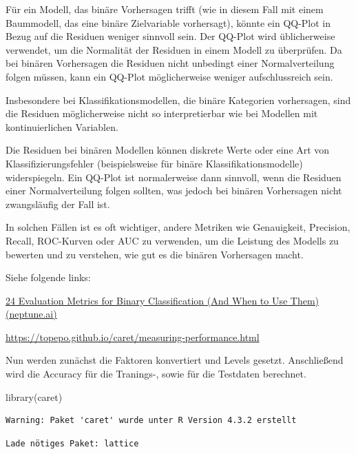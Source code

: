 \documentclass[
  letterpaper,
  DIV=11,
  numbers=noendperiod]{scrartcl}
\newenvironment{Shaded}{\begin{snugshade}}{\end{snugshade}}
\newcommand{\FunctionTok}[1]{\textcolor[rgb]{0.28,0.35,0.67}{#1}}
\newcommand{\NormalTok}[1]{\textcolor[rgb]{0.00,0.23,0.31}{#1}}
\begin{document}
Für ein Modell, das binäre Vorhersagen trifft (wie in diesem Fall mit
einem Baummodell, das eine binäre Zielvariable vorhersagt), könnte ein
QQ-Plot in Bezug auf die Residuen weniger sinnvoll sein. Der QQ-Plot
wird üblicherweise verwendet, um die Normalität der Residuen in einem
Modell zu überprüfen. Da bei binären Vorhersagen die Residuen nicht
unbedingt einer Normalverteilung folgen müssen, kann ein QQ-Plot
möglicherweise weniger aufschlussreich sein.

Insbesondere bei Klassifikationsmodellen, die binäre Kategorien
vorhersagen, sind die Residuen möglicherweise nicht so interpretierbar
wie bei Modellen mit kontinuierlichen Variablen.

Die Residuen bei binären Modellen können diskrete Werte oder eine Art
von Klassifizierungsfehler (beispielsweise für binäre
Klassifikationsmodelle) widerspiegeln. Ein QQ-Plot ist normalerweise
dann sinnvoll, wenn die Residuen einer Normalverteilung folgen sollten,
was jedoch bei binären Vorhersagen nicht zwangsläufig der Fall ist.

In solchen Fällen ist es oft wichtiger, andere Metriken wie Genauigkeit,
Precision, Recall, ROC-Kurven oder AUC zu verwenden, um die Leistung des
Modells zu bewerten und zu verstehen, wie gut es die binären Vorhersagen
macht.

Siehe folgende links:

\href{https://neptune.ai/blog/evaluation-metrics-binary-classification}{24
Evaluation Metrics for Binary Classification (And When to Use Them)
(neptune.ai)}

\url{https://topepo.github.io/caret/measuring-performance.html}

Nun werden zunächst die Faktoren konvertiert und Levels gesetzt.
Anschließend wird die Accuracy für die Tranings-, sowie für die
Testdaten berechnet.

\begin{Shaded}
\begin{Highlighting}[]
\FunctionTok{library}\NormalTok{(caret)}
\end{Highlighting}
\end{Shaded}

\begin{verbatim}
Warning: Paket 'caret' wurde unter R Version 4.3.2 erstellt
\end{verbatim}

\begin{verbatim}
Lade nötiges Paket: lattice
\end{verbatim}
\end{document}
